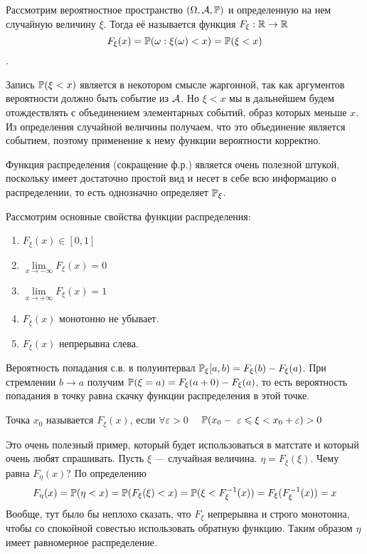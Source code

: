\documentclass[../TV&MS.tex]{subfiles}
\begin{document}
\begin{Def}
Рассмотрим вероятностное пространство $(\Omega, \mathcal{A}, \mathbb{P})$ и определенную на нем 
случайную величину $\xi$. Тогда её 
называется функция $F_\xi : \mathbb{R} \to \mathbb{R}$
$$F_\xi(x) = \mathbb{P}(\omega : \xi(\omega) < x) = \mathbb{P}(\xi < x)$$.
\end{Def}

Запись $\mathbb{P}(\xi < x)$ является в некотором смысле жаргонной, так как аргументов 
вероятности должно быть событие из $\mathcal{A}$. Но $\xi < x$ мы в дальнейшем будем 
отождествлять с объединением элементарных событий, образ которых меньше $x$. Из определения 
случайной величины получаем, что это объединение является событием,
поэтому применение к нему функции вероятности корректно.

Функция распределения (сокращение ф.р.) является очень полезной штукой, поскольку имеет 
достаточно простой вид и несет в себе всю информацию о распределении, то есть однозначно 
определяет $\mathbb{P}_\xi$.

Рассмотрим основные свойства функции распределения:
\begin{enumerate}
	\item $F_\xi(x) \in [0, 1]$
	\item $\lim\limits_{x \to -\infty} F_\xi(x) = 0$
	\item $\lim\limits_{x \to +\infty} F_\xi(x) = 1$
	\item $F_\xi(x)$ монотонно не убывает.
	\item $F_\xi(x)$ непрерывна слева.
\end{enumerate}

Вероятность попадания с.в. в полуинтервал $\mathbb{P}_\xi[a,b) = F_\xi(b) - F_\xi(a)$. При 
стремлении $b \to a$ получим $\mathbb{P}(\xi = a) = F_\xi(a+0) - F_\xi(a)$, то есть 
вероятность попадания в точку равна скачку функции распределения в этой точке.

\begin{Def}
Точка $x_0$ называется  $F_\xi(x)$, если $\forall \varepsilon > 0 \quad$
$\mathbb{P}(x_0 -~\varepsilon \leqslant \xi < x_0 + \varepsilon) > 0$
\end{Def}

\begin{Ex}
Это очень полезный пример, который будет использоваться в матстате и который очень любят спрашивать. 
Пусть $\xi$ --- случайная величина. $\eta = F_\xi(\xi)$. Чему равна $F_\eta(x)$? По определению 
\begin{equation}\label{fXiOfXi}
F_\eta(x) = \mathbb{P}(\eta < x) = \mathbb{P}(F_\xi(\xi) < x)=\mathbb{P}(\xi < F_\xi^{-1}(x)) = F_\xi(F_\xi^{-1}(x))=x
\end{equation}
Вообще, тут было бы неплохо сказать, что $F_\xi$ непрерывна и строго монотонна, чтобы со спокойной 
совестью использовать обратную функцию. Таким образом $\eta$ имеет равномерное распределение.
\end{Ex}
\end{document}
